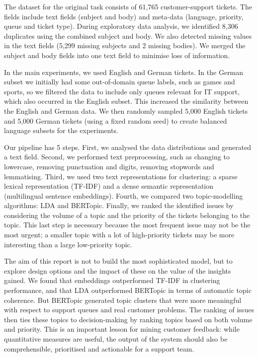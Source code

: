 \documentclass[11pt]{article}
\begin{document}
The dataset for the original task consists of 61,765 customer-support tickets. The fields include text fields (subject and body) and meta-data (language, priority, queue and ticket type). During exploratory data analysis, we identified 8,306 duplicates using the combined subject and body. We also detected missing values in the text fields (5,299 missing subjects and 2 missing bodies). We merged the subject and body fields into one text field to minimise loss of information.

In the main experiments, we used English and German tickets. In the German subset we initially had some out-of-domain queue labels, such as games and sports, so we filtered the data to include only queues relevant for IT support, which also occurred in the English subset. This increased the similarity between the English and German data. We then randomly sampled 5,000 English tickets and 5,000 German tickets (using a fixed random seed) to create balanced language subsets for the experiments.

Our pipeline has 5 steps. First, we analysed the data distributions and generated a text field. Second, we performed text preprocessing, such as changing to lowercase, removing punctuation and digits, removing stopwords and lemmatising. Third, we used two text representations for clustering: a sparse lexical representation (TF-IDF) and a dense semantic representation (multilingual sentence embeddings). Fourth, we compared two topic-modelling algorithms: LDA and BERTopic. Finally, we ranked the identified issues by considering the volume of a topic and the priority of the tickets belonging to the topic. This last step is necessary because the most frequent issue may not be the most urgent; a smaller topic with a lot of high-priority tickets may be more interesting than a large low-priority topic.

The aim of this report is not to build the most sophisticated model, but to explore design options and the impact of these on the value of the insights gained. We found that embeddings outperformed TF-IDF in clustering performance, and that LDA outperformed BERTopic in terms of automatic topic coherence. But BERTopic generated topic clusters that were more meaningful with respect to support queues and real customer problems. The ranking of issues then ties these topics to decision-making by ranking topics based on both volume and priority. This is an important lesson for mining customer feedback: while quantitative measures are useful, the output of the system should also be comprehensible, prioritised and actionable for a support team.
\end{document}
